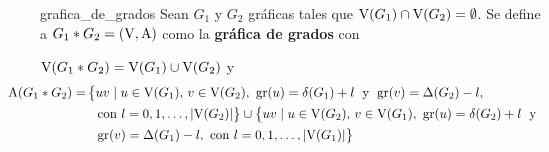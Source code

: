 \documentclass[fleqn, 11pt]{article}
\begin{document}
    \begin{definicion}[beforeafter skip = 4mm]{}{grafica_de_grados}
        Sean $ G_1 $ y $ G_2 $ gráficas tales que $ \textnormal{V}(G_1) \cap \textnormal{V}(G_2) = \emptyset $. Se define a $ G_1 \ast G_2 = (\textnormal{V}, \textnormal{A}) $ como la \textbf{gráfica de grados} con \vspace{2mm}
        
        $ \textnormal{V}(G_1 \ast G_2) = \textnormal{V}(G_1) \cup \textnormal{V}(G_2) $ \quad y \vspace{-1mm}
        \begin{align*}
            \hspace{-9mm} \textnormal{A}(G_1 \ast G_2) =& \left\{ uv \mid u \in \textnormal{V}(G_1), \, v \in \textnormal{V}(G_2), \textnormal{ gr}(u) = \delta(G_1) + l \phantom{|_i^i} \textnormal{y} \phantom{|_i^i} \textnormal{gr}(v) = \Delta(G_2) - l, \right. \\
            & \left. \phantom{|_i^i} \textnormal{con } l = 0,1, \ldots, \lvert \textnormal{V}(G_2) \rvert \right\} \cup  \left\{ uv \mid u \in \textnormal{V}(G_2), \, v \in \textnormal{V}(G_1), \textnormal{ gr}(u) = \delta(G_2) + l \phantom{|_i^i} \textnormal{y } \right. \\
            & \left. \phantom{|_i^i} \textnormal{gr}(v) = \Delta(G_1) - l, \textnormal{ con } l = 0,1, \ldots, \lvert \textnormal{V}(G_1) \rvert \right\}
        \end{align*}
    \end{definicion}
\end{document}
